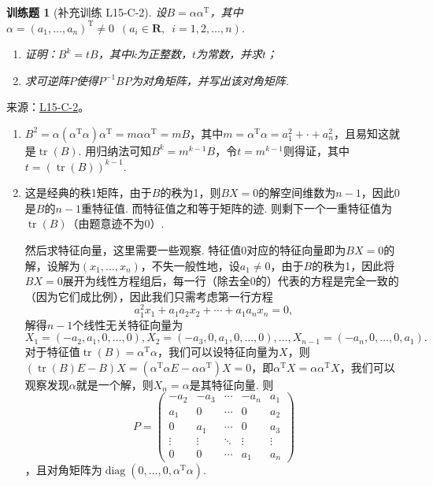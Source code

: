 \documentclass[UTF8,12pt,a4paper,fontset=fandol]{ctexart}
\newtheorem{exercise}{训练题}[section]
\begin{document}
\begin{exercise}[补充训练 L15-C-2]\label{prob:L15-C-2}
设$B=\alpha\alpha^\mathrm{T}$，其中$\alpha=(a_1,\ldots,a_n)^\mathrm{T}\neq 0\enspace(a_i\in\mathbf{R},\enspace i=1,2,\ldots,n)$.
        \begin{enumerate}
            \item 证明：$B^k=tB$，其中$k$为正整数，$t$为常数，并求$t$；

            \item 求可逆阵$P$使得$P^{-1}BP$为对角矩阵，并写出该对角矩阵.
        \end{enumerate}
\end{exercise}
\noindent 来源：\href{https://github.com/yhwu-is/Linear-Algebra-Left-Undone/blob/new/%E8%AE%B2%E4%B9%89/%E4%B8%93%E9%A2%98/15%20%E7%9B%B8%E4%BC%BC%E6%A0%87%E5%87%86%E5%BD%A2%EF%BC%9A%E5%A4%8D%E6%95%B0%E5%9F%9F%E4%B8%8A%E7%9A%84%E5%B0%9D%E8%AF%95%E4%B8%8E%E7%90%86%E8%AE%BA.tex}{L15-C-2}。
\begin{solve}
\begin{enumerate}
                \item $B^2=\alpha(\alpha^\mathrm{T}\alpha)\alpha^\mathrm{T}=m\alpha\alpha^\mathrm{T}=mB$，其中$m=\alpha^\mathrm{T}\alpha=a_1^2+\cdot+a_n^2$，且易知这就是$\operatorname{tr}(B)$. 用归纳法可知$B^k=m^{k-1}B$，令$t=m^{k-1}$则得证，其中$t=(\operatorname{tr}(B))^{k-1}$.

                \item 这是经典的秩1矩阵，由于$B$的秩为1，则$BX=0$的解空间维数为$n-1$，因此0是$B$的$n-1$重特征值. 而特征值之和等于矩阵的迹. 则剩下一个一重特征值为$\operatorname{tr}(B)$（由题意迹不为0）.

                      然后求特征向量，这里需要一些观察. 特征值0对应的特征向量即为$BX=0$的解，设解为$(x_1,\ldots,x_n)$，不失一般性地，设$a_1\neq 0$，由于$B$的秩为1，因此将$BX=0$展开为线性方程组后，每一行（除去全0的）代表的方程是完全一致的（因为它们成比例），因此我们只需考虑第一行方程
                      \[a_1^2x_1+a_1a_2x_2+\cdots+a_1a_nx_n=0,\]
                      解得$n-1$个线性无关特征向量为
                      \[X_1=(-a_2,a_1,0,\ldots,0),X_2=(-a_3,0,a_1,0,\ldots,0),\ldots,X_{n-1}=(-a_n,0,\ldots,0,a_1).\]
                      对于特征值$\operatorname{tr}(B)=\alpha^\mathrm{T}\alpha$，我们可以设特征向量为$X$，则$(\operatorname{tr}(B)E-B)X=(\alpha^\mathrm{T}\alpha E-\alpha\alpha^\mathrm{T})X=0$，即$\alpha^\mathrm{T}X=\alpha\alpha^\mathrm{T}X$，我们可以观察发现$\alpha$就是一个解，则$X_n=\alpha$是其特征向量. 则
\[P=\begin{pmatrix}
                              -a_2 & -a_3 & \cdots & -a_n & a_1 \\ a_1 & 0 & \cdots & 0 & a_2 \\ 0 & a_1 & \cdots & 0 & a_3 \\ \vdots & \vdots & \ddots & \vdots & \vdots \\ 0 & 0 & \cdots & a_1 & a_n
                          \end{pmatrix}\]
，且对角矩阵为$\operatorname{diag}(0,\ldots,0,\alpha^\mathrm{T}\alpha)$.
            \end{enumerate}
\end{solve}
\end{document}
